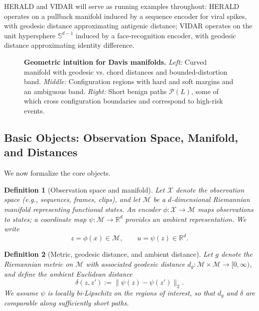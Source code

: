 \documentclass[11pt]{article}
\newtheorem{definition}{Definition}
\theoremstyle{remark}
\theoremstyle{plain}
\begin{document}
HERALD and VIDAR will serve as running examples throughout:
HERALD operates on a pullback manifold induced by a sequence encoder for viral spikes,
with geodesic distance approximating antigenic distance; VIDAR operates on the unit
hypersphere $\mathbb{S}^{d-1}$ induced by a face-recognition encoder, with geodesic
distance approximating identity difference.

\begin{figure}[t]
    \centering
    \caption{\textbf{Geometric intuition for Davis manifolds.}
    \emph{Left:} Curved manifold with geodesic vs. chord distances and bounded-distortion band.
    \emph{Middle:} Configuration regions with hard and soft margins and an ambiguous band.
    \emph{Right:} Short benign paths $\mathcal{P}(L)$, some of which cross configuration
    boundaries and correspond to high-risk events.}
    \label{fig:intuition}
\end{figure}

\subsection{Basic Objects: Observation Space, Manifold, and Distances}
\label{subsec:basic-objects}

We now formalize the core objects.

\begin{definition}[Observation space and manifold]
Let $\mathcal{X}$ denote the observation space (e.g., sequences, frames, clips), and let
$\mathcal{M}$ be a $d$-dimensional Riemannian manifold representing functional states.
An encoder $\phi:\mathcal{X} \to \mathcal{M}$ maps observations to states; a coordinate
map $\psi:\mathcal{M} \to \mathbb{R}^d$ provides an ambient representation. We write
\[
    z = \phi(x) \in \mathcal{M}, \qquad u = \psi(z) \in \mathbb{R}^d.
\]
\end{definition}

\begin{definition}[Metric, geodesic distance, and ambient distance]
Let $g$ denote the Riemannian metric on $\mathcal{M}$ with associated geodesic distance
$d_g:\mathcal{M}\times\mathcal{M} \to [0,\infty)$, and define the ambient Euclidean distance
\[
    \delta(z,z') := \|\psi(z) - \psi(z')\|_2.
\]
We assume $\psi$ is locally bi-Lipschitz on the regions of interest, so that $d_g$ and
$\delta$ are comparable along sufficiently short paths.
\end{definition}
\end{document}
